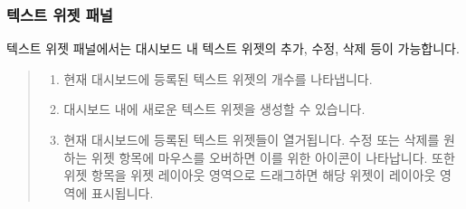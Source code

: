 \documentclass[letterpaper,10pt,english]{sphinxmanual}
\begin{document}
\subsubsection{텍스트 위젯 패널}
\label{\detokenize{discovery/part04/change_dashboard_layout_and_size:id4}}
텍스트 위젯 패널에서는 대시보드 내 텍스트 위젯의 추가, 수정, 삭제 등이 가능합니다.
\begin{quote}

\begin{figure}[H]
\centering

\noindent{}
\end{figure}
\begin{enumerate}
\def\theenumi{\arabic{enumi}}
\def\labelenumi{\theenumi .}
\makeatletter\def\p@enumii{\p@enumi \theenumi .}\makeatother
\item {} 
 현재 대시보드에 등록된 텍스트 위젯의 개수를 나타냅니다.

\item {} 
 대시보드 내에 새로운 텍스트 위젯을 생성할 수 있습니다.

\item {} 
 현재 대시보드에 등록된 텍스트 위젯들이 열거됩니다. 수정 또는 삭제를 원하는 위젯 항목에 마우스를 오버하면 이를 위한 아이콘이 나타납니다. 또한 위젯 항목을 위젯 레이아웃 영역으로 드래그하면 해당 위젯이 레이아웃 영역에 표시됩니다.

\end{enumerate}
\end{quote}
\end{document}
